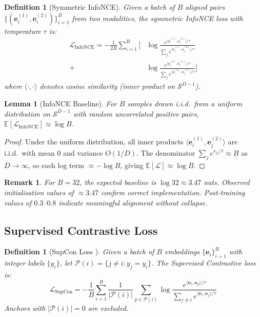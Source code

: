 \documentclass[10pt,conference]{IEEEtran}
\theoremstyle{ieeethm}
\newtheorem{lemma}[theorem]{Lemma}
\theoremstyle{ieeedef}
\newtheorem{definition}[theorem]{Definition}
\theoremstyle{ieeeremark}
\newtheorem*{remark}{Remark}
\begin{document}
\begin{definition}[Symmetric InfoNCE]
\label{def:infonce}
Given a batch of $B$ aligned pairs $\{(\mathbf{e}^{(1)}_i, \mathbf{e}^{(2)}_i)\}_{i=1}^B$ from two modalities, the symmetric InfoNCE loss with temperature $\tau$ is:
\begin{equation}
\begin{split}
\mathcal{L}_{\text{InfoNCE}} = -\frac{1}{2B}\sum_{i=1}^{B}\Biggl[
  &\log\frac{e^{\langle\mathbf{e}^{(1)}_i,\mathbf{e}^{(2)}_i\rangle/\tau}}
           {\sum_{j} e^{\langle\mathbf{e}^{(1)}_i,\mathbf{e}^{(2)}_j\rangle/\tau}}\\
+ &\log\frac{e^{\langle\mathbf{e}^{(2)}_i,\mathbf{e}^{(1)}_i\rangle/\tau}}
           {\sum_{j} e^{\langle\mathbf{e}^{(2)}_i,\mathbf{e}^{(1)}_j\rangle/\tau}}
\Biggr]
\end{split}
\label{eq:infonce}
\end{equation}
where $\langle\cdot,\cdot\rangle$ denotes cosine similarity (inner product on $\mathcal{S}^{D-1}$).
\end{definition}

\begin{lemma}[InfoNCE Baseline]
\label{lem:infonce_baseline}
For $B$ samples drawn i.i.d.\ from a uniform distribution on $\mathcal{S}^{D-1}$ with random uncorrelated positive pairs, $\mathbb{E}[\mathcal{L}_{\text{InfoNCE}}] \approx \log B$.
\end{lemma}
\begin{proof}
Under the uniform distribution, all inner products $\langle\mathbf{e}^{(1)}_i, \mathbf{e}^{(2)}_j\rangle$ are i.i.d.\ with mean $0$ and variance $O(1/D)$. The denominator $\sum_j e^{s_{ij}/\tau} \approx B$ as $D \to \infty$, so each log term $\approx -\log B$, giving $\mathbb{E}[\mathcal{L}] \approx \log B$.
\end{proof}

\begin{remark}
For $B{=}32$, the expected baseline is $\log 32 \approx 3.47$ nats. Observed initialisation values of $\approx 3.47$ confirm correct implementation. Post-training values of $0.3$–$0.8$ indicate meaningful alignment without collapse.
\end{remark}

\subsection{Supervised Contrastive Loss}

\begin{definition}[SupCon Loss \cite{khosla2020supervised}]
\label{def:supcon}
Given a batch of $B$ embeddings $\{\mathbf{e}_i\}_{i=1}^B$ with integer labels $\{y_i\}$, let $\mathcal{P}(i) = \{j \neq i : y_j = y_i\}$. The Supervised Contrastive loss is:
\begin{equation}
\mathcal{L}_{\text{SupCon}} = -\frac{1}{B}\sum_{i=1}^{B}
  \frac{1}{|\mathcal{P}(i)|}\sum_{p \in \mathcal{P}(i)}
  \log\frac{e^{\langle\mathbf{e}_i,\mathbf{e}_p\rangle/\tau}}
           {\sum_{j \neq i} e^{\langle\mathbf{e}_i,\mathbf{e}_j\rangle/\tau}}
\label{eq:supcon}
\end{equation}
Anchors with $|\mathcal{P}(i)| = 0$ are excluded.
\end{definition}
\end{document}
